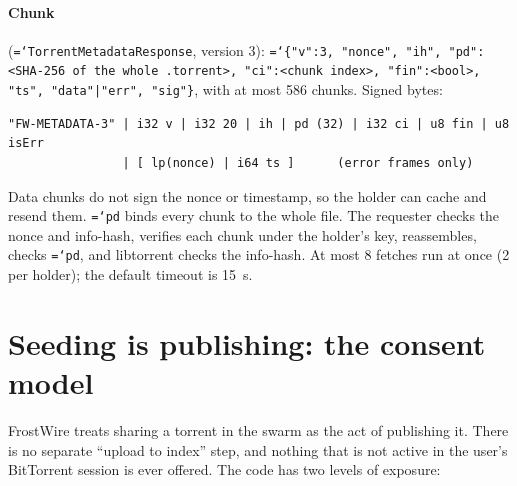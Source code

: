 \documentclass[11pt,a4paper]{article}
\newcommand{\code}[1]{\texttt{\hyphenchar\font=`\-\relax #1}}
\DeclareRobustCommand{\_}{\origunderscore\allowbreak}
\begin{document}
\paragraph{Chunk} (\code{TorrentMetadataResponse}, version 3):
\code{\{"v":3, "nonce", "ih", "pd":<SHA-256 of the whole .torrent>, "ci":<chunk index>,
"fin":<bool>, "ts", "data"|"err", "sig"\}}, with at most 586 chunks. Signed bytes:
\begin{lstlisting}
"FW-METADATA-3" | i32 v | i32 20 | ih | pd (32) | i32 ci | u8 fin | u8 isErr
                | [ lp(nonce) | i64 ts ]      (error frames only)
\end{lstlisting}
Data chunks do not sign the nonce or timestamp, so the holder can cache and resend them.
\code{pd} binds every chunk to the whole file. The requester checks the nonce and info-hash,
verifies each chunk under the holder's key, reassembles, checks \code{pd}, and libtorrent
checks the info-hash. At most 8 fetches run at once (2 per holder); the default timeout is
15~s.

\section{Seeding is publishing: the consent model}
\label{sec:seeding}

FrostWire treats sharing a torrent in the swarm as the act of publishing it. There is no
separate ``upload to index'' step, and nothing that is not active in the user's BitTorrent
session is ever offered. The code has two levels of exposure:
\end{document}
